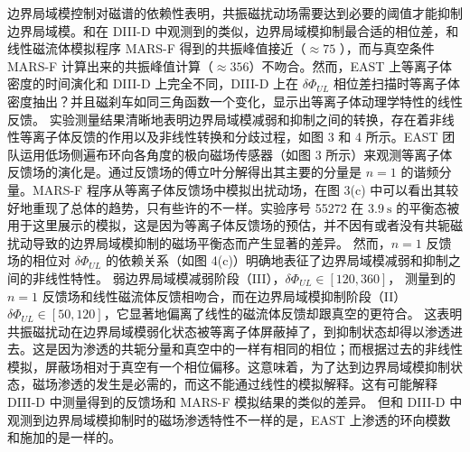 边界局域模控制对磁谱的依赖性表明，共振磁扰动场需要达到必要的阈值才能抑制边界局域模。和在 DIII-D 中观测到的类似，边界局域模抑制最合适的相位差，和线性磁流体模拟程序 MARS-F 得到的共振峰值接近（$\approx 75$ \degree），而与真空条件 MARS-F 计算出来的共振峰值计算（$\approx 356$\degree）不吻合。然而，EAST 上等离子体密度的时间演化和 DIII-D 上完全不同，DIII-D 上在 $\delta\Phi_{UL}$ 相位差扫描时等离子体密度抽出？并且磁刹车如同三角函数一个变化，显示出等离子体动理学特性的线性反馈。
实验测量结果清晰地表明边界局域模减弱和抑制之间的转换，存在着非线性等离子体反馈的作用以及非线性转换和分歧过程，如图 3 和 4 所示。EAST 团队运用低场侧遍布环向各角度的极向磁场传感器（如图 3 所示）来观测等离子体反馈场的演化是。通过反馈场的傅立叶分解得出其主要的分量是 $n=1$ 的谐频分量。MARS-F 程序从等离子体反馈场中模拟出扰动场，在图 3(c) 中可以看出其较好地重现了总体的趋势，只有些许的不一样。实验序号 55272 在 $\SI{3.9}{\second}$ 的平衡态被用于这里展示的模拟，这是因为等离子体反馈场的预估，并不因有或者没有共轭磁扰动导致的边界局域模抑制的磁场平衡态而产生显著的差异。
然而，$n=1$ 反馈场的相位对 $\delta\Phi_{UL}$ 的依赖关系（如图 4(c)）明确地表征了边界局域模减弱和抑制之间的非线性特性。
弱边界局域模减弱阶段（III），$\delta\Phi_{UL}\in [120,360]$\degree， 测量到的 $n=1$ 反馈场和线性磁流体反馈相吻合，而在边界局域模抑制阶段（II）$\delta\Phi_{UL}\in [50,120]$\degree，它显著地偏离了线性的磁流体反馈却跟真空的更符合。
这表明共振磁扰动在边界局域模弱化状态被等离子体屏蔽掉了，到抑制状态却得以渗透进去。这是因为渗透的共轭分量和真空中的一样有相同的相位；而根据过去的非线性模拟，屏蔽场相对于真空有一个相位偏移。这意味着，为了达到边界局域模抑制状态，磁场渗透的发生是必需的，而这不能通过线性的模拟解释。这有可能解释 DIII-D 中测量得到的反馈场和 MARS-F 模拟结果的类似的差异。
但和 DIII-D 中观测到边界局域模抑制时的磁场渗透特性不一样的是，EAST 上渗透的环向模数和施加的是一样的。



